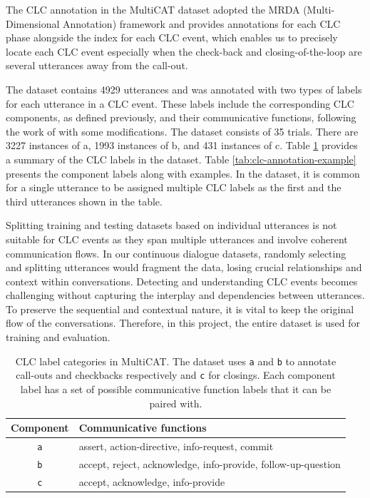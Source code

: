 \documentclass[11pt]{article}
\begin{document}
The CLC annotation in the MultiCAT dataset adopted the MRDA (Multi-Dimensional Annotation) framework and provides annotations for each CLC phase alongside the index for each CLC event, which enables us to precisely locate each CLC event especially when the check-back and closing-of-the-loop are several utterances away from the call-out.

The dataset contains 4929 utterances and was annotated with two types of labels for each utterance in a CLC event. These labels include the corresponding CLC components, as defined previously, and their communicative functions, following the work of \citep{marzuki2019closed} with some modifications. The dataset consists of 35 trials. There are 3227 instances of a, 1993 instances of b, and 431 instances of c. Table  \ref{tab:clc-label-category} provides a summary of the CLC labels in the dataset. Table \ref{tab:clc-annotation-example} presents the component labels along with examples. In the dataset, it is common for a single utterance to be assigned multiple CLC labels as the first and the third utterances shown in the table.

Splitting training and testing datasets based on individual utterances is not suitable for CLC events as they span multiple utterances and involve coherent communication flows. In our continuous dialogue datasets, randomly selecting and splitting utterances would fragment the data, losing crucial relationships and context within conversations. Detecting and understanding CLC events becomes challenging without capturing the interplay and dependencies between utterances. To preserve the sequential and contextual nature, it is vital to keep the original flow of the conversations. Therefore, in this project, the entire dataset is used for training and evaluation. 

\begin{table}
    \centering
    \footnotesize
    \begin{tabularx}{\linewidth}{cX}
    \toprule
    Component & Communicative functions \\
    \midrule
       \texttt{a} & assert, action-directive, info-request, commit \\
       \texttt{b} & accept, reject, acknowledge, info-provide, follow-up-question \\
       \texttt{c} & accept, acknowledge, info-provide \\
       \bottomrule
    \end{tabularx}
    \caption{%
        CLC label categories in MultiCAT.
        The dataset uses \texttt{a} and \texttt{b} to annotate call-outs and checkbacks respectively and \texttt{c} for closings. Each component label has a set of possible communicative function labels that it can be paired with. 
    }
    \label{tab:clc-label-category}
\end{table}
\end{document}

